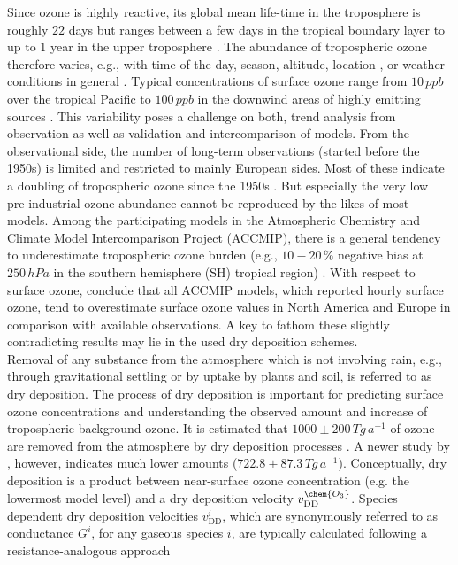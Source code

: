 \documentclass[gmd, manuscript]{copernicus}
\begin{document}
Since ozone is highly reactive, its global mean life-time in the troposphere is roughly $22$ days but ranges between a few days in the tropical boundary layer to up to $1$ year in the upper troposphere \citep{JGR:Stevenson2005,ACP:Young2013}. The abundance of tropospheric ozone therefore varies, e.g., with time of the day, season, altitude, location \citep{ACP:Schnell2015}, or weather conditions in general \citep{ACP:Otero2018}. Typical concentrations of surface ozone range from $10\,\unit{ppb}$ over the tropical Pacific to $100\,\unit{ppb}$ in the downwind areas of highly emitting sources \citep[Chapter 8]{IPCC2013}. This variability poses a challenge on both, trend analysis from observation as well as validation and intercomparison of models. From the observational side, the number of long-term observations (started before the 1950s) is limited and restricted to mainly European sides. Most of these indicate a doubling of tropospheric ozone since the 1950s \citep[Chapter 2]{IPCC2013}. But especially the very low pre-industrial ozone abundance cannot be reproduced by the likes of most models. Among the participating models in the Atmospheric Chemistry and Climate Model Intercomparison Project (ACCMIP), there is a general tendency to underestimate tropospheric ozone burden (e.g., $10-20\,\unit{\%}$ negative bias at $250\,\unit{hPa}$ in the southern hemisphere (SH) tropical region) \citep[Chapter 8]{IPCC2013}. With respect to surface ozone, \citet{ACP:Schnell2015} conclude that all ACCMIP models, which reported hourly surface ozone, tend to overestimate surface ozone values in North America and Europe in comparison with available observations. A key to fathom these slightly contradicting results may lie in the used dry deposition schemes.\\
Removal of any substance from the atmosphere which is not involving rain, e.g., through gravitational settling or by uptake by plants and soil, is referred to as dry deposition. The process of dry deposition is important for predicting surface ozone concentrations and understanding the observed amount and increase of tropospheric background ozone. It is estimated that $1000 \pm 200\,\unit{Tg\,a^{-1}}$ of ozone are removed from the atmosphere by dry deposition processes \citep{ACP:Monks2015}. A newer study by \citet{ACP:Luhar2018}, however, indicates much lower amounts ($722.8 \pm 87.3\,\unit{Tg\,a^{-1}}$). Conceptually, dry deposition is a product between near-surface ozone concentration  (e.g. the lowermost model level) and a dry deposition velocity $v^\chem{O_3}_\text{DD}$. Species dependent dry deposition velocities $v^i_\text{DD}$, which are synonymously referred to as conductance $G^i$, for any gaseous species $i$, are typically calculated following a resistance-analogous approach
\end{document}
